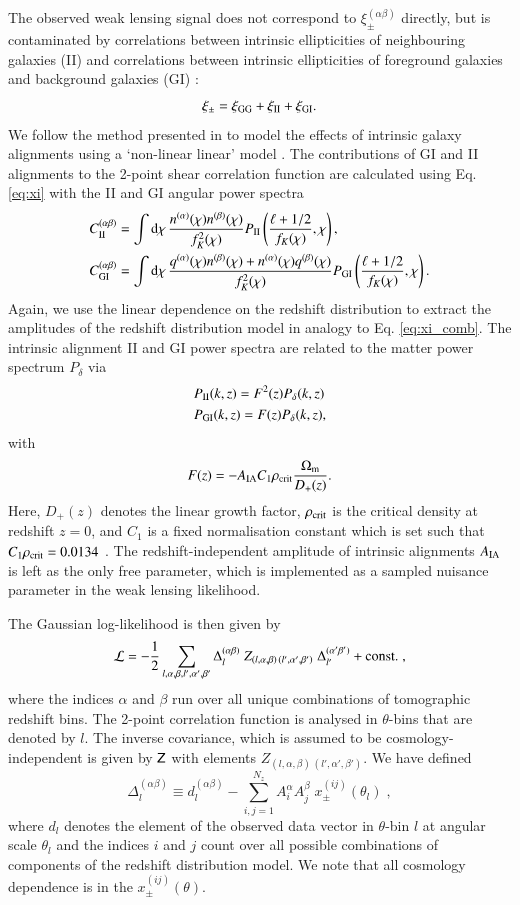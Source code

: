 \documentclass{aa}
\newcommand{\eq}[1]{\begin{equation}  #1 \end{equation}}
\newcommand{\eqa}[1]{\begin{align}   #1 \end{align}}
\newcommand{\dd}{{\rm d}}
\begin{document}
The observed weak lensing signal does not correspond to $\xi_\pm^{(\alpha\beta)}$ directly, but is contaminated by correlations between intrinsic ellipticities of neighbouring galaxies (II) and correlations between intrinsic ellipticities of foreground galaxies and background galaxies (GI) \citep{hirata04}:
\eq{
\xi_\pm = \xi_{\rm GG} + \xi_{\rm II}+ \xi_{\rm GI}.
}
We follow the method presented in \cite{hildebrandt17} to model the effects of intrinsic galaxy alignments using a `non-linear linear' model \citep{hirata04,bridle07,joachimi11}. The contributions of GI and II alignments to the 2-point shear correlation function are calculated using Eq. \eqref{eq:xi} with the II and GI angular power spectra
\eqa{
C_{\rm II}^{(\alpha\beta)} &=\int\dd\chi\,\frac{n^{(\alpha)}(\chi)n^{(\beta)}(\chi)}{f_K^2(\chi)}P_{\rm II}\left(\frac{\ell + 1/2}{f_K(\chi)},\chi\right),\\ 
C_{\rm GI}^{(\alpha\beta)} &=\int\dd\chi\,\frac{q^{(\alpha)}(\chi)n^{(\beta)}(\chi)+n^{(\alpha)}(\chi)q^{(\beta)}(\chi)}{f_K^2(\chi)}P_{\rm GI}\left(\frac{\ell + 1/2}{f_K(\chi)},\chi\right).
}
Again, we use the linear dependence on the redshift distribution to extract the amplitudes of the redshift distribution model in analogy to Eq. \eqref{eq:xi_comb}. 
The intrinsic alignment II and GI power spectra are related to the matter power spectrum $P_\delta$ via
\eqa{
&P_{\rm II}(k,z) = F^2(z) P_\delta(k,z)\label{eq:P_II}\\
&P_{\rm GI}(k,z) = F(z) P_\delta(k,z),\label{eq:P_GI}
}
with
\eq{
\label{eq:F_z}
F(z) = -A_{\rm IA}C_1\rho_{\rm crit} \frac{\Omega_{\rm m}}{D_+(z)}.
}
Here, $D_+(z)$ denotes the linear growth factor, $\rho_{\rm crit}$ is the critical density at redshift $z=0$, and $C_1$ is a fixed normalisation constant which is set such that $C_1\rho_{\rm crit} = 0.0134$ \citep{joachimi11}. The redshift-independent amplitude of intrinsic alignments $A_{\rm IA}$ is left as the only free parameter, which is implemented as a sampled nuisance parameter in the weak lensing likelihood. 

The Gaussian log-likelihood is then given by
\eq{
{\cal L} = - \frac{1}{2} \sum_{l,\alpha,\beta, l', \alpha', \beta'} \Delta_l^{(\alpha \beta)}\; Z_{(l,\alpha,\beta) \,  (l',\alpha',\beta')}\; \Delta_{l'}^{(\alpha' \beta')} + {\rm const.}\;,
}
where the indices $\alpha$ and $\beta$ run over all unique combinations of tomographic redshift bins. The 2-point correlation function is analysed in $\theta$-bins that are denoted by $l$. The inverse covariance, which is assumed to be cosmology-independent is given by $\mathsf{Z}$ with elements $Z_{(l,\alpha,\beta) \,  (l',\alpha',\beta')}$. We have defined
\eq{
\label{eq:Delta}
\Delta_l^{(\alpha \beta)} \equiv d_l^{(\alpha \beta)} - \sum_{i,j=1}^{N_z} A_i^\alpha A_j^\beta\; x_\pm^{(ij)}(\theta_l)\;,
}
where $d_l$ denotes the element of the observed data vector in $\theta$-bin $l$ at angular scale $\theta_l$ and the indices $i$ and $j$ count over all possible combinations of components of the redshift distribution model. We note that all cosmology dependence is in the $x_\pm^{(ij)}(\theta)$.
\end{document}
